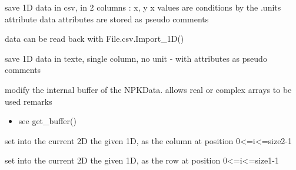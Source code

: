 \documentclass[letterpaper,10pt,openany,oneside]{sphinxmanual}
\begin{document}
\begin{fulllineitems}

\begin{fulllineitems}
\label{rst/code:NPKData.NPKData.save_csv}
save 1D data in csv,
in 2 columns : 
x, y   x values are conditions by the .units attribute
data attributes are stored as pseudo comments

data can be read back with File.csv.Import\_1D()

\end{fulllineitems}


\begin{fulllineitems}
\label{rst/code:NPKData.NPKData.save_txt}
save 1D data in texte, single column, no unit - with attributes as pseudo comments

\end{fulllineitems}


\begin{fulllineitems}
\label{rst/code:NPKData.NPKData.set_buffer}
modify the internal buffer of the NPKData.
allows real or complex arrays to be used
remarks
\begin{itemize}
\item {} 
see get\_buffer()

\end{itemize}

\end{fulllineitems}


\begin{fulllineitems}
\label{rst/code:NPKData.NPKData.set_col}
set into the current 2D the given 1D, as the column at position 0\textless{}=i\textless{}=size2-1

\end{fulllineitems}


\begin{fulllineitems}
\label{rst/code:NPKData.NPKData.set_row}
set into the current 2D the given 1D, as the row at position 0\textless{}=i\textless{}=size1-1


\end{fulllineitems}
\end{fulllineitems}
\end{document}
